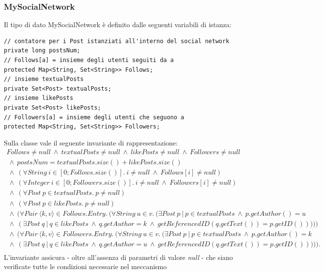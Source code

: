 \documentclass[10pt, italian, openany]{book}
\begin{document}
\subsubsection*{MySocialNetwork}
Il tipo di dato MySocialNetwork \`e definito dalle seguenti variabili di istanza:
\begin{lstlisting}[style=codeStyle]
// contatore per i Post istanziati all'interno del social network
private long postsNum; 
// Follows[a] = insieme degli utenti seguiti da a
protected Map<String, Set<String>> Follows;
// insieme textualPosts
private Set<Post> textualPosts;
// insieme likePosts
private Set<Post> likePosts;
// Followers[a] = insieme degli utenti che seguono a
protected Map<String, Set<String>> Followers;
\end{lstlisting}
Sulla classe vale il seguente invariante di rappresentazione:
\begin{gather*}
Follows \neq null \ \wedge \ textualPosts \neq null \ \wedge \ likePosts \neq null  \ \wedge \ Followers \neq null \\
\ \wedge \ postsNum =  textualPosts.size() + likePosts.size() \\
\ \wedge \ ( \forall String \ i \in [0; Follows.size()]. \ i \neq null \ \wedge \ Follows[i] \neq null ) \\
\ \wedge \ ( \forall Integer \ i \in [0; Followers.size()]. \ i \neq null \ \wedge \  Followers[i] \neq null) \\
\ \wedge \ (\forall Post \ p \in textualPosts. \ p \neq null) \\
\ \wedge \ (\forall Post \ p \in likePosts. \ p \neq null) \\
\ \wedge \ ( \forall Pair \ \langle k, v \rangle \in Follows.Entry. \ (\forall String \ u \in v. \ (\exists Post \ p \ | \ p \in textualPosts \ \wedge \ p.getAuthor() = u \\
\ \wedge \ ( \exists Post \ q \ | \ q \in likePosts \ \wedge \ q.getAuthor = k \ \wedge \ getReferencedID(q.getText()) = p.getID())))) \\
\ \wedge \ ( \forall Pair \ \langle k, v \rangle \in Followers.Entry. \ (\forall String \ u \in v. \ (\exists Post \ p \ | \ p \in textualPosts \ \wedge \ p.getAuthor() = k \\
\ \wedge \ ( \exists Post \ q \ | \ q \in likePosts \ \wedge \ q.getAuthor = u \ \wedge \ getReferencedID(q.getText()) = p.getID())))). \\
\end{gather*}
L'invariante assicura - oltre all'assenza di parametri di valore \textit{null} - che siano verificate tutte le condizioni necessarie nel meccanismo 
\end{document}
